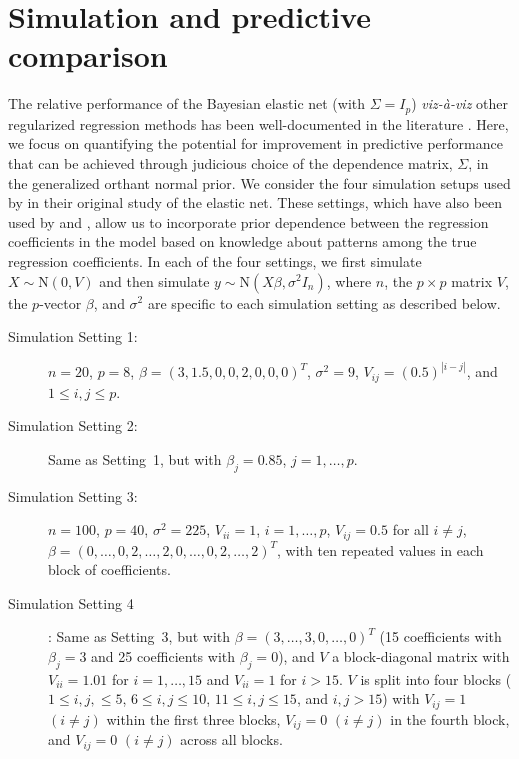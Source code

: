 \documentclass[12pt]{article}
\begin{document}
\section{Simulation and predictive comparison}\label{sec:sim}
The relative performance of the Bayesian elastic net (with $\Sigma = I_p$) \emph{viz-\`a-viz}
other regularized regression methods has been well-documented in the literature 
\citep[e.g.,][]{li:10, hans:11,roy:17, wang:23}. Here, we focus on quantifying the potential
for improvement in predictive performance that can be achieved through judicious choice of
the dependence matrix, $\Sigma$, in the generalized orthant normal prior. We consider the 
four simulation setups used by \citet{zou:05} in their original study of the elastic net.
These settings, which have also been used by \citet{hans:11} and \citet{wang:23}, allow us
to incorporate prior dependence between the regression coefficients in the model based on
knowledge about patterns among the true regression coefficients. In each of the four settings,
we first simulate $X \sim \mbox{N}(0, V)$ and then simulate $y \sim \mbox{N}(X\beta, \sigma^2 I_n)$, 
where $n$, the $p\times p$ matrix $V$, the $p$-vector $\beta$, and $\sigma^2$ are specific to each 
simulation setting as described below.
\begin{description}
\item[Simulation Setting 1:] $n=20$, $p=8$, $\beta = (3, 1.5, 0, 0, 2, 0, 0, 0)^T$, $\sigma^2 = 9$,
$V_{ij} = (0.5)^{|i-j|}$, and $1 \leq i,j \leq p$.
\item[Simulation Setting 2:] Same as Setting~1, but with $\beta_j = 0.85$, $j=1,\ldots,p$.
\item[Simulation Setting 3:] $n=100$, $p=40$, $\sigma^2 = 225$, $V_{ii} = 1$, $i=1,\ldots,p$,
$V_{ij} = 0.5$ for all $i\neq j$, $\beta = (0, \ldots, 0, 2, \ldots, 2, 0, \ldots, 0,
2, \ldots, 2)^T$, with ten repeated values in each block of coefficients.
\item[Simulation Setting 4]: Same as Setting~3, but with $\beta = (3, \ldots, 3, 0, \ldots, 0)^T$
(15 coefficients with $\beta_j=3$ and 25 coefficients with $\beta_j = 0$), and
$V$ a block-diagonal matrix with $V_{ii} = 1.01$ for $i=1,\ldots,15$ and $V_{ii} = 1$
for $i > 15$. $V$ is split into four blocks ($1\leq i, j, \leq 5$, $6\leq i, j \leq 10$,
$11\leq i, j \leq 15$, and $i,j > 15$) with $V_{ij} = 1$ $(i \neq j)$ within the first three blocks,
$V_{ij} = 0$ $(i \neq j)$ in the fourth block, and $V_{ij} = 0$ $(i \neq j)$ across all blocks.
\end{description}
\end{document}

